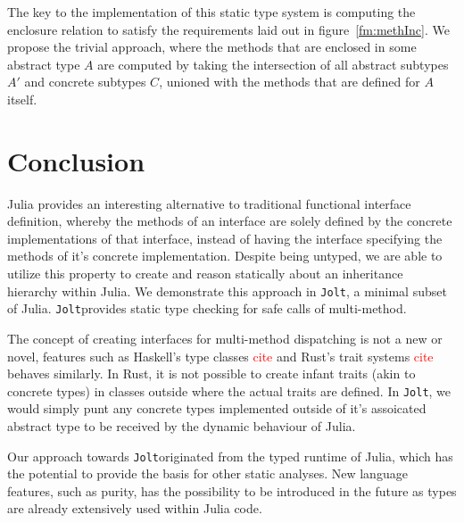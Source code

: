 \documentclass[preprint]{sigplanconf}
\newcommand{\xt}[1]{\texttt{#1}}
\newcommand{\jolt}{\xt{Jolt}}
\begin{document}
The key to the implementation of this static type system is computing the 
enclosure relation to satisfy the requirements laid out in figure~\ref{fm:methInc}.
We propose the trivial approach, where the methods that are enclosed in some
abstract type $A$ are computed by taking the intersection of all abstract subtypes
$A'$ and concrete subtypes $C$, unioned with the methods that are defined for $A$
itself. 

\section{Conclusion}

Julia provides an interesting alternative to traditional functional interface 
definition, whereby the methods of an interface are solely defined by 
the concrete implementations of that interface, instead of having the interface specifying
the methods of it's concrete implementation. Despite being
untyped, we are able to utilize this property to create and reason statically about an inheritance
hierarchy within Julia. We demonstrate this approach in \jolt\space, a minimal subset
of Julia. \jolt\space provides static type checking for safe calls of multi-method.

The concept of creating interfaces for multi-method dispatching is not a new or novel, features such 
as Haskell's type classes \textcolor{red}{cite} and Rust's trait systems \textcolor{red}{cite} behaves similarly.
In Rust, it is not possible to create infant traits (akin to concrete types) in classes outside where 
the actual traits are defined. In \jolt, we would simply punt any concrete types implemented outside of it's
assoicated abstract type to be received by the dynamic behaviour of Julia.

Our approach towards \jolt originated from the typed runtime of Julia, which has the potential to
provide the basis for other static analyses. New language features, such as purity, has the possibility
to be introduced in the future as types are already extensively used within Julia code.



\end{document}
